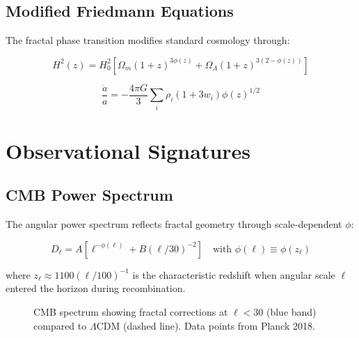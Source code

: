 \documentclass[aps,prl,twocolumn,groupedaddress]{revtex4-2}
\begin{document}
\subsection{Modified Friedmann Equations}
The fractal phase transition modifies standard cosmology through:

\begin{equation}
H^2(z) = H_0^2\left[\Omega_m(1+z)^{3\phi(z)} + \Omega_\Lambda(1+z)^{3(2-\phi(z))}\right]
\end{equation}

\begin{equation}
\frac{\ddot{a}}{a} = -\frac{4\pi G}{3}\sum_i \rho_i(1+3w_i)\phi(z)^{1/2}
\end{equation}

\section{Observational Signatures}

\subsection{CMB Power Spectrum}
The angular power spectrum reflects fractal geometry through scale-dependent $\phi$:

\begin{equation}
D_\ell = A\left[\ell^{-\phi(\ell)} + B(\ell/30)^{-2}\right]
\quad \text{with } \phi(\ell) \equiv \phi(z_\ell)
\end{equation}

where $z_\ell \approx 1100(\ell/100)^{-1}$ is the characteristic redshift when angular scale $\ell$ entered the horizon during recombination.

\begin{figure}[htbp]
\centering
{}
\caption{CMB spectrum showing fractal corrections at $\ell<30$ (blue band) compared to $\Lambda$CDM (dashed line). Data points from Planck 2018.}
\end{figure}
\end{document}
